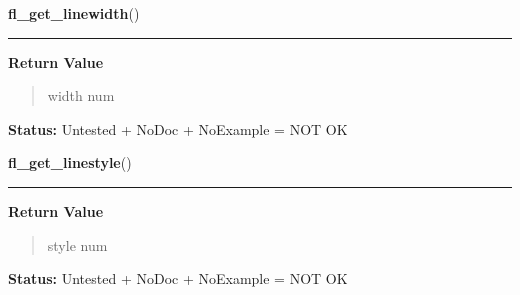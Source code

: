     \label{xformslib:library:fl_get_linewidth}

    \vspace{0.5ex}

\hspace{.8\funcindent}\begin{boxedminipage}{\funcwidth}

    \raggedright \textbf{fl\_get\_linewidth}()

    \vspace{-1.5ex}

    \rule{\textwidth}{0.5\fboxrule}
\setlength{\parskip}{2ex}
\setlength{\parskip}{1ex}
      \textbf{Return Value}
    \vspace{-1ex}

      \begin{quote}
      width num

      \end{quote}

\textbf{Status:} Untested + NoDoc + NoExample = NOT OK



    \end{boxedminipage}

    \label{xformslib:library:fl_get_linestyle}

    \vspace{0.5ex}

\hspace{.8\funcindent}\begin{boxedminipage}{\funcwidth}

    \raggedright \textbf{fl\_get\_linestyle}()

    \vspace{-1.5ex}

    \rule{\textwidth}{0.5\fboxrule}
\setlength{\parskip}{2ex}
\setlength{\parskip}{1ex}
      \textbf{Return Value}
    \vspace{-1ex}

      \begin{quote}
      style num

      \end{quote}

\textbf{Status:} Untested + NoDoc + NoExample = NOT OK



    \end{boxedminipage}

